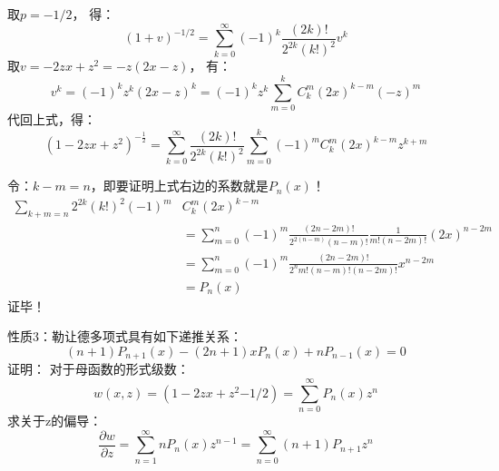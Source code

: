 \begin{frame}
	取$p=-1/2$， 得：
	\begin{equation*}
		(1+v)^{-1/2}=\sum_{k=0}^{\infty}(-1)^{k} \frac{(2 k) !}{2^{2 k}(k !)^{2}} v^{k}
	\end{equation*}	
	取$v=-2zx+z^2=-z(2x-z)$， 有：
	\begin{equation*}
		v^{k}=(-1)^{k} z^{k}(2 x-z)^{k}=(-1)^{k} z^{k} \sum_{m=0}^{k} C_{k}^{m}(2 x)^{k-m}(-z)^{m}
	\end{equation*}	
	代回上式，得：
	\begin{equation*}
		\left(1-2 z x+z^{2}\right)^{-\frac{1}{2}}=\sum_{k=0}^{\infty} \frac{(2 k) !}{2^{2 k}(k !)^{2}} \sum_{m=0}^{k}(-1)^{m} C_{k}^{m}(2 x)^{k-m} z^{k+m}
	\end{equation*}	
\end{frame}	

\begin{frame}
	令：$k-m=n$，即要证明上式右边的系数就是$P_n(x)$！
	\begin{equation*}
	\begin{split}
		\sum_{k+m=n}{2^{2 k}(k !)^{2}}(-1)^{m} &C_{k}^{m}(2 x)^{k-m}\\
		&=\sum_{m=0}^{n}(-1)^{m} \frac{(2 n-2 m) !}{2^{2(n-m)}(n-m) !} \frac{1}{m !(n-2 m) !}(2 x)^{n-2 m}\\
		&=\sum_{m=0}^{n}(-1)^{m} \frac{(2 n-2 m) !}{2^{n} m !(n-m) !(n-2 m) !} x^{n-2 m} \\
		&=P_{n}(x)
	\end{split}
	\end{equation*}	
	\alert{证毕！}
\end{frame}	

\begin{frame}
	\alert{性质3：}勒让德多项式具有如下递推关系：
	\begin{equation*}
		(n+1) P_{n+1}(x)-(2 n+1) x P_{n}(x)+n P_{n-1}(x)=0
	\end{equation*}	
	\alert{证明：} 对于母函数的形式级数：
	\begin{equation*}
		w(x, z)=(1-2zx+z^2{-1/2})=\sum_{n=0}^{\infty} P_{n}(x) z^{n}
	\end{equation*}	
	求关于z的偏导：
	\begin{equation*}
		\frac{\partial w}{\partial z}=\sum_{n=1}^{\infty} n P_{n}(x) z^{n-1}=\sum_{n=0}^{\infty}(n+1) P_{n+1} z^{n}
	\end{equation*}		
\end{frame}	


